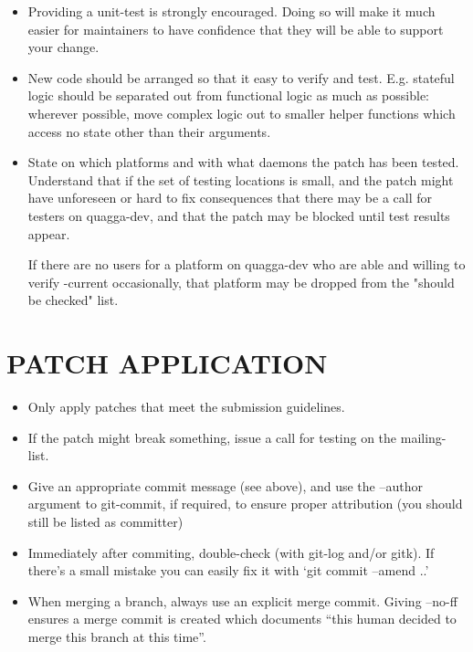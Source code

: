 \documentclass[oneside]{article}
\begin{document}
\begin{itemize}
\item Providing a unit-test is strongly encouraged. Doing so will make it
      much easier for maintainers to have confidence that they will be able
      to support your change.

\item New code should be arranged so that it easy to verify and test. E.g. 
      stateful logic should be separated out from functional logic as much as
      possible: wherever possible, move complex logic out to smaller helper
      functions which access no state other than their arguments.

\item State on which platforms and with what daemons the patch has been
      tested.  Understand that if the set of testing locations is small,
      and the patch might have unforeseen or hard to fix consequences that
      there may be a call for testers on quagga-dev, and that the patch
      may be blocked until test results appear.

      If there are no users for a platform on quagga-dev who are able and
      willing to verify -current occasionally, that platform may be
      dropped from the "should be checked" list.

\end{itemize}

\section{PATCH APPLICATION}

\begin{itemize}

\item Only apply patches that meet the submission guidelines.

\item If the patch might break something, issue a call for testing on the
      mailing-list.

\item Give an appropriate commit message (see above), and use the --author
      argument to git-commit, if required, to ensure proper attribution (you
      should still be listed as committer)

\item Immediately after commiting, double-check (with git-log and/or gitk).
      If there's a small mistake you can easily fix it with `git commit
      --amend ..'

\item When merging a branch, always use an explicit merge commit. Giving
      --no-ff ensures a merge commit is created which documents ``this human
      decided to merge this branch at this time''.
\end{itemize}
\end{document}
